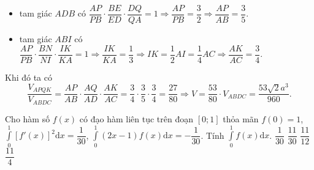 \begin{ex}
{\begin{itemize}
\item tam giác $ ADB $ có $ \dfrac{AP}{PB}\cdot \dfrac{BE}{ED}\cdot \dfrac{DQ}{QA}=1\Rightarrow \dfrac{AP}{PB}=\dfrac{3}{2}\Rightarrow \dfrac{AP}{AB}=\dfrac{3}{5} $.
\item tam giác $ ABI $ có $ \dfrac{AP}{PB}\cdot \dfrac{BN}{NI}\cdot \dfrac{IK}{KA}=1\Rightarrow \dfrac{IK}{KA}=\dfrac{1}{3}\Rightarrow IK=\dfrac{1}{2}AI=\dfrac{1}{4}AC\Rightarrow \dfrac{AK}{AC}=\dfrac{3}{4} $.
\end{itemize}
Khi đó ta có
\[ 
\dfrac{V_{APQK}}{V_{ABDC}}=\dfrac{AP}{AB}\cdot \dfrac{AQ}{AD}\cdot \dfrac{AK}{AC}=\dfrac{3}{4}\cdot \dfrac{3}{5}\cdot \dfrac{3}{4}=\dfrac{27}{80}
\Rightarrow V=\dfrac{53}{80}\cdot V_{ABDC}=\dfrac{53\sqrt{2}a^{3}}{960}.
\]
}
\end{ex}
\begin{ex}%
	Cho hàm số $ f(x) $ có đạo hàm liên tục trên đoạn $ [0;1] $ thỏa mãn $ f(0)=1 $, $ \displaystyle\int\limits_{0}^{1}[f'(x)]^{2}\mathrm{d}x=\dfrac{1}{30} $, $ \displaystyle\int\limits_{0}^{1}(2x-1)f(x)\mathrm{d}x=-\dfrac{1}{30} $. Tính $ \displaystyle\int\limits_{0}^{1}f(x)\mathrm{d}x $.
	\choice
	{$ \dfrac{1}{30} $}
	{$ \dfrac{11}{30} $}
	{\True $ \dfrac{11}{12} $}
	{$ \dfrac{11}{4} $}
\end{ex}
